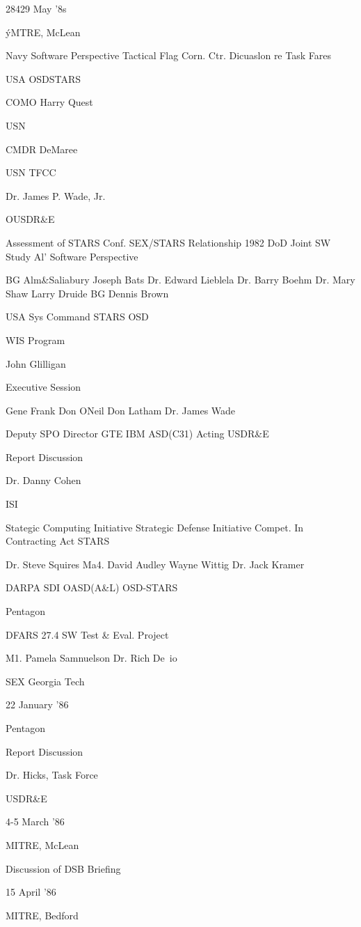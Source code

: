 \documentclass[12pt]{article}
\begin{document}
28429 May '8s

ýMTRE, McLean

Navy Software Perspective
Tactical Flag Corn. Ctr.
Dicuaslon re Task Fares

USA
OSDSTARS

COMO Harry Quest

USN

CMDR DeMaree

USN TFCC

Dr. James P. Wade, Jr.

OUSDR\&E

Assessment of STARS Conf.
SEX/STARS Relationship
1982 DoD Joint SW Study
Al' Software Perspective

BG Alm\&Saliabury
Joseph Bats
Dr. Edward Lieblela
Dr. Barry Boehm
Dr. Mary Shaw
Larry Druide
BG Dennis Brown

USA Sys Command
STARS
OSD

WIS Program

John Glilligan

Executive Session

Gene Frank
Don ONeil
Don Latham
Dr. James Wade

Deputy SPO Director
GTE
IBM
ASD(C31)
Acting USDR\&E

Report Discussion

Dr. Danny Cohen

ISI

Stategic Computing Initiative
Strategic Defense Initiative
Compet. In Contracting Act
STARS

Dr. Steve Squires
Ma4. David Audley
Wayne Wittig
Dr. Jack Kramer

DARPA
SDI
OASD(A\&L)
OSD-STARS

Pentagon

DFARS 27.4
SW Test \& Eval. Project

M1. Pamela Samnuelson
Dr. Rich De~io

SEX
Georgia Tech

22 January '86

Pentagon

Report Discussion

Dr. Hicks, Task Force

USDR\&E

4-5 March '86

MITRE, McLean

Discussion of DSB Briefing

15 April '86

MITRE, Bedford
\end{document}
